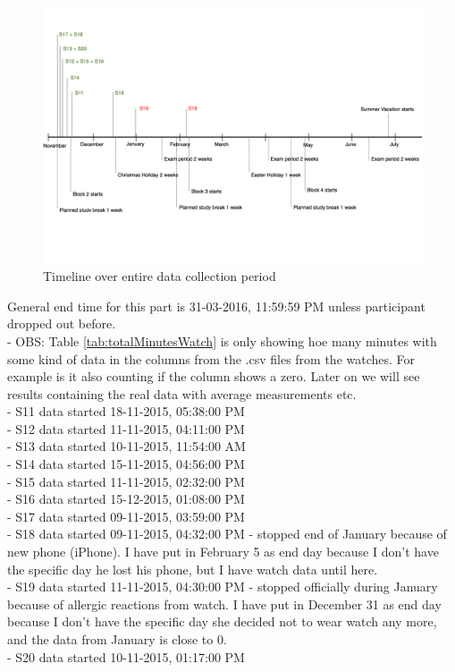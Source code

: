 \documentclass[12pt]{article} %
\begin{document}
\begin{figure}[H]
    \centering
        \includegraphics[width=\textwidth]{timeline}
        \caption{Timeline over entire data collection period}
        \label{fig:timeline}
\end{figure}

General end time for this part is 31-03-2016, 11:59:59 PM unless participant dropped out before. \\

- OBS: Table \ref{tab:totalMinutesWatch} is only showing hoe many minutes with some kind of data in the columns from the .csv files from the watches. For example is it also counting if the column shows a zero. Later on we will see results containing the real data with average measurements etc. \\

- S11 data started 18-11-2015, 05:38:00 PM\\
- S12 data started 11-11-2015, 04:11:00 PM\\
- S13 data started 10-11-2015, 11:54:00 AM\\
- S14 data started 15-11-2015, 04:56:00 PM\\
- S15 data started 11-11-2015, 02:32:00 PM\\
- S16 data started 15-12-2015, 01:08:00 PM\\
- S17 data started 09-11-2015, 03:59:00 PM\\
- S18 data started 09-11-2015, 04:32:00 PM - stopped end of January because of new phone (iPhone). I have put in February 5 as end day because I don't have the specific day he lost his phone, but I have watch data until here.\\
- S19 data started 11-11-2015, 04:30:00 PM - stopped officially during January because of allergic reactions from watch. I have put in December 31 as end day because I don't have the specific day she decided not to wear watch any more, and the data from January is close to 0. \\
- S20 data started 10-11-2015, 01:17:00 PM
\end{document}
